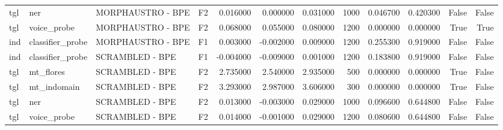 \begin{table}
\begin{tabular}{llllrrrrrrrr}
tgl & ner & MORPHAUSTRO - BPE & F2 & 0.016000 & 0.000000 & 0.031000 & 1000 & 0.046700 & 0.420300 & False & False \\
tgl & voice\_probe & MORPHAUSTRO - BPE & F2 & 0.068000 & 0.055000 & 0.080000 & 1200 & 0.000000 & 0.000000 & True & True \\
ind & classifier\_probe & MORPHAUSTRO - BPE & F1 & 0.003000 & -0.002000 & 0.009000 & 1200 & 0.255300 & 0.919000 & False & False \\
ind & classifier\_probe & SCRAMBLED - BPE & F1 & -0.004000 & -0.009000 & 0.001000 & 1200 & 0.183800 & 0.919000 & False & False \\
tgl & mt\_flores & SCRAMBLED - BPE & F2 & 2.735000 & 2.540000 & 2.935000 & 500 & 0.000000 & 0.000000 & True & False \\
tgl & mt\_indomain & SCRAMBLED - BPE & F2 & 3.293000 & 2.987000 & 3.606000 & 300 & 0.000000 & 0.000000 & True & False \\
tgl & ner & SCRAMBLED - BPE & F2 & 0.013000 & -0.003000 & 0.029000 & 1000 & 0.096600 & 0.644800 & False & False \\
tgl & voice\_probe & SCRAMBLED - BPE & F2 & 0.014000 & -0.001000 & 0.029000 & 1200 & 0.080600 & 0.644800 & False & False \\
\bottomrule
\end{tabular}
\end{table}
